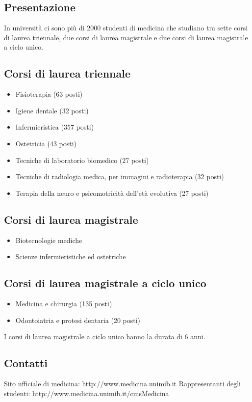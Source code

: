 
\subsection{Presentazione}
In università ci sono più di 2000 studenti di medicina che studiano tra sette corsi di laurea triennale, due corsi di laurea magistrale e due corsi di laurea magistrale a ciclo unico. 

\subsection{Corsi di laurea triennale}
\begin{itemize}
\item Fisioterapia (63 posti) 
\item Igiene dentale (32 posti) 
\item Infermieristica (357 posti) 
\item Ostetricia (43 posti) 
\item Tecniche di laboratorio biomedico (27 posti) 
\item Tecniche di radiologia medica, per immagini e radioterapia (32 posti) 
\item Terapia della neuro e psicomotricità dell'età evolutiva (27 posti) 
\end{itemize}

\subsection{Corsi di laurea magistrale}
\begin{itemize}
\item Biotecnologie mediche 
\item Scienze infermieristiche ed ostetriche
\end{itemize}

\subsection{Corsi di laurea magistrale a ciclo unico}
\begin{itemize}
\item Medicina e chirurgia (135 posti) 
\item Odontoiatria e protesi dentaria (20 posti) 
\end{itemize}
I corsi di laurea magistrale a ciclo unico hanno la durata di 6 anni. 

\subsection{Contatti}
Sito ufficiale di medicina: http://www.medicina.unimib.it 
Rappresentanti degli studenti: http://www.medicina.unimib.it/cmsMedicina
